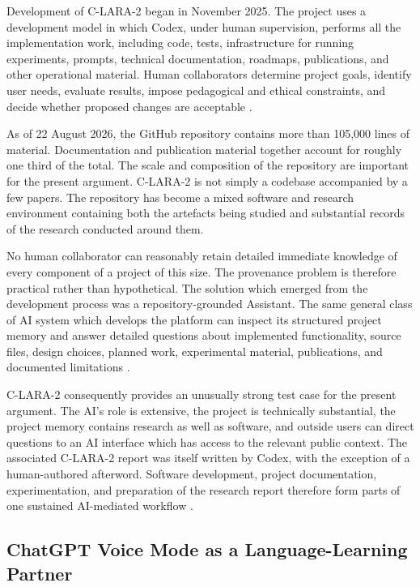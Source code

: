 \documentclass[12pt]{article}
\begin{document}
Development of C-LARA-2 began in November 2025. The project uses a development model in which Codex, under human supervision, performs all the implementation work, including code, tests, infrastructure for running experiments, prompts, technical documentation, roadmaps, publications, and other operational material. Human collaborators determine project goals, identify user needs, evaluate results, impose pedagogical and ethical constraints, and decide whether proposed changes are acceptable \citep[Section~2.4]{bediEtAl2026clara2}.

As of 22 August 2026, the GitHub repository contains more than 105,000 lines of material. Documentation and publication material together account for roughly one third of the total.
The scale and composition of the repository are important for the present argument. C-LARA-2 is not simply a codebase accompanied by a few papers. The repository has become a mixed software and research environment containing both the artefacts being studied and substantial records of the research conducted around them.

No human collaborator can reasonably retain detailed immediate knowledge of every component of a project of this size. The provenance problem is therefore practical rather than hypothetical.
The solution which emerged from the development process was a repository-grounded Assistant. The same general class of AI system which develops the platform can inspect its structured project memory and answer detailed questions about implemented functionality, source files, design choices, planned work, experimental material, publications, and documented limitations \citep[Section~9]{bediEtAl2026clara2}.

C-LARA-2 consequently provides an unusually strong test case for the present argument. The AI's role is extensive, the project is technically substantial, the project memory contains research as well as software, and outside users can direct questions to an AI interface which has access to the relevant public context.
The associated C-LARA-2 report was itself written by Codex, with the exception of a human-authored afterword. Software development, project documentation, experimentation, and preparation of the research report therefore form parts of one sustained AI-mediated workflow \citep[Abstract]{bediEtAl2026clara2}.


\subsection{ChatGPT Voice Mode as a Language-Learning Partner}
\end{document}
